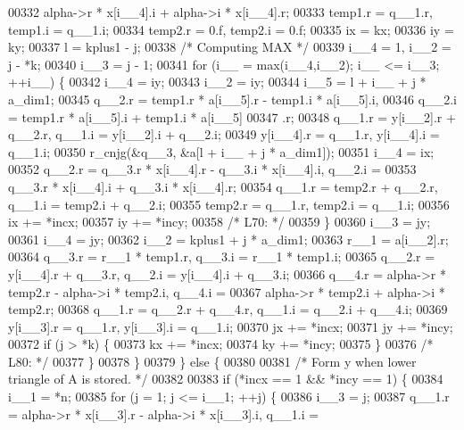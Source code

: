 \begin{DoxyCode}
00332              alpha->r * x[i\_\_4].i + alpha->i * x[i\_\_4].r;
00333         temp1.r = q\_\_1.r, temp1.i = q\_\_1.i;
00334         temp2.r = 0.f, temp2.i = 0.f;
00335         ix = kx;
00336         iy = ky;
00337         l = kplus1 - j;
00338 \textcolor{comment}{/* Computing MAX */}
00339         i\_\_4 = 1, i\_\_2 = j - *k;
00340         i\_\_3 = j - 1;
00341         \textcolor{keywordflow}{for} (i\_\_ = max(i\_\_4,i\_\_2); i\_\_ <= i\_\_3; ++i\_\_) \{
00342             i\_\_4 = iy;
00343             i\_\_2 = iy;
00344             i\_\_5 = l + i\_\_ + j * a\_dim1;
00345             q\_\_2.r = temp1.r * a[i\_\_5].r - temp1.i * a[i\_\_5].i, 
00346                 q\_\_2.i = temp1.r * a[i\_\_5].i + temp1.i * a[i\_\_5]
00347                 .r;
00348             q\_\_1.r = y[i\_\_2].r + q\_\_2.r, q\_\_1.i = y[i\_\_2].i + q\_\_2.i;
00349             y[i\_\_4].r = q\_\_1.r, y[i\_\_4].i = q\_\_1.i;
00350             r\_cnjg(&q\_\_3, &a[l + i\_\_ + j * a\_dim1]);
00351             i\_\_4 = ix;
00352             q\_\_2.r = q\_\_3.r * x[i\_\_4].r - q\_\_3.i * x[i\_\_4].i, q\_\_2.i =
00353                  q\_\_3.r * x[i\_\_4].i + q\_\_3.i * x[i\_\_4].r;
00354             q\_\_1.r = temp2.r + q\_\_2.r, q\_\_1.i = temp2.i + q\_\_2.i;
00355             temp2.r = q\_\_1.r, temp2.i = q\_\_1.i;
00356             ix += *incx;
00357             iy += *incy;
00358 \textcolor{comment}{/* L70: */}
00359         \}
00360         i\_\_3 = jy;
00361         i\_\_4 = jy;
00362         i\_\_2 = kplus1 + j * a\_dim1;
00363         r\_\_1 = a[i\_\_2].r;
00364         q\_\_3.r = r\_\_1 * temp1.r, q\_\_3.i = r\_\_1 * temp1.i;
00365         q\_\_2.r = y[i\_\_4].r + q\_\_3.r, q\_\_2.i = y[i\_\_4].i + q\_\_3.i;
00366         q\_\_4.r = alpha->r * temp2.r - alpha->i * temp2.i, q\_\_4.i = 
00367             alpha->r * temp2.i + alpha->i * temp2.r;
00368         q\_\_1.r = q\_\_2.r + q\_\_4.r, q\_\_1.i = q\_\_2.i + q\_\_4.i;
00369         y[i\_\_3].r = q\_\_1.r, y[i\_\_3].i = q\_\_1.i;
00370         jx += *incx;
00371         jy += *incy;
00372         \textcolor{keywordflow}{if} (j > *k) \{
00373             kx += *incx;
00374             ky += *incy;
00375         \}
00376 \textcolor{comment}{/* L80: */}
00377         \}
00378     \}
00379     \} \textcolor{keywordflow}{else} \{
00380 
00381 \textcolor{comment}{/*        Form  y  when lower triangle of A is stored. */}
00382 
00383     \textcolor{keywordflow}{if} (*incx == 1 && *incy == 1) \{
00384         i\_\_1 = *n;
00385         \textcolor{keywordflow}{for} (j = 1; j <= i\_\_1; ++j) \{
00386         i\_\_3 = j;
00387         q\_\_1.r = alpha->r * x[i\_\_3].r - alpha->i * x[i\_\_3].i, q\_\_1.i =

\end{DoxyCode}
